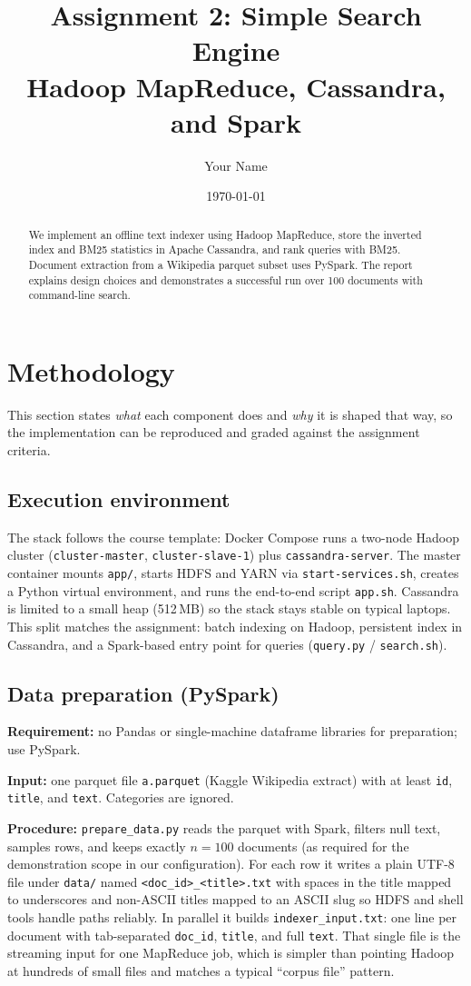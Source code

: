 \documentclass[11pt,a4paper]{article}
\title{Assignment 2: Simple Search Engine\\Hadoop MapReduce, Cassandra, and Spark}
\author{Your Name}
\date{\today}
\begin{document}
\maketitle

\begin{abstract}
We implement an offline text indexer using Hadoop MapReduce, store the inverted index and BM25 statistics in Apache Cassandra, and rank queries with BM25. Document extraction from a Wikipedia parquet subset uses PySpark. The report explains design choices and demonstrates a successful run over 100 documents with command-line search.
\end{abstract}

\section{Methodology}

This section states \emph{what} each component does and \emph{why} it is shaped that way, so the implementation can be reproduced and graded against the assignment criteria.

\subsection{Execution environment}
The stack follows the course template: Docker Compose runs a two-node Hadoop cluster (\texttt{cluster-master}, \texttt{cluster-slave-1}) plus \texttt{cassandra-server}. The master container mounts \texttt{app/}, starts HDFS and YARN via \texttt{start-services.sh}, creates a Python virtual environment, and runs the end-to-end script \texttt{app.sh}. Cassandra is limited to a small heap (512\,MB) so the stack stays stable on typical laptops. This split matches the assignment: batch indexing on Hadoop, persistent index in Cassandra, and a Spark-based entry point for queries (\texttt{query.py} / \texttt{search.sh}).

\subsection{Data preparation (PySpark)}
\textbf{Requirement:} no Pandas or single-machine dataframe libraries for preparation; use PySpark.

\textbf{Input:} one parquet file \texttt{a.parquet} (Kaggle Wikipedia extract) with at least \texttt{id}, \texttt{title}, and \texttt{text}. Categories are ignored.

\textbf{Procedure:} \texttt{prepare\_data.py} reads the parquet with Spark, filters null text, samples rows, and keeps exactly $n=100$ documents (as required for the demonstration scope in our configuration). For each row it writes a plain UTF-8 file under \texttt{data/} named \texttt{<doc\_id>\_<title>.txt} with spaces in the title mapped to underscores and non-ASCII titles mapped to an ASCII slug so HDFS and shell tools handle paths reliably. In parallel it builds \texttt{indexer\_input.txt}: one line per document with tab-separated \texttt{doc\_id}, \texttt{title}, and full \texttt{text}. That single file is the streaming input for one MapReduce job, which is simpler than pointing Hadoop at hundreds of small files and matches a typical ``corpus file'' pattern.
\end{document}
